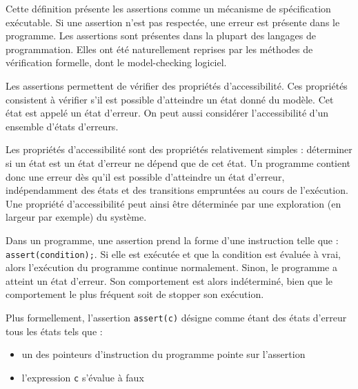 


Cette définition présente les assertions comme un mécanisme de spécification
exécutable. Si une assertion n'est pas respectée, une erreur est présente dans
le programme. Les assertions sont présentes dans la plupart des langages de
programmation. Elles ont été naturellement reprises par les méthodes de
vérification formelle, dont le model-checking logiciel.

Les assertions permettent de vérifier des propriétés d'accessibilité. Ces
propriétés consistent à vérifier s’il est possible d'atteindre un état donné du
modèle. Cet état est appelé un état d'erreur. On peut aussi considérer
l'accessibilité d'un ensemble d'états d'erreurs.

Les propriétés d'accessibilité sont des propriétés relativement simples :
déterminer si un état est un état d'erreur ne dépend que de cet état. Un
programme contient donc une erreur dès qu'il est possible d'atteindre un état
d'erreur, indépendamment des états et des transitions empruntées au cours de
l'exécution. Une propriété d'accessibilité peut ainsi être déterminée par une
exploration (en largeur par exemple) du système.

Dans un programme, une assertion prend la forme d'une instruction telle que :\\
\texttt{assert(condition);}.
Si elle est exécutée et que la condition est évaluée à vrai, alors l'exécution
du programme continue normalement.
Sinon, le programme a atteint un état d'erreur. Son comportement est alors
indéterminé, bien que le comportement le plus fréquent soit de stopper son
exécution.

Plus formellement, l'assertion \texttt{assert(c)} désigne comme étant des
états d'erreur tous les états tels que :

\begin{itemize}
\item
  un des pointeurs d'instruction du programme pointe sur l'assertion
\item
  l'expression \texttt{c} s'évalue à faux
\end{itemize}

